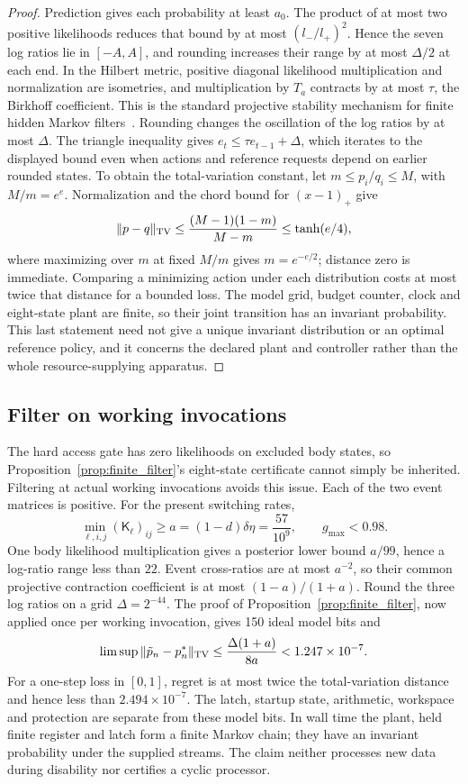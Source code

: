 \documentclass[12pt]{article}
\theoremstyle{definition}
\begin{document}
\begin{proof}
Prediction gives each probability at least $a_0$. The product of at most two positive likelihoods reduces that bound by at most $(l_-/l_+)^2$. Hence the seven log ratios lie in $[-A,A]$, and rounding increases their range by at most $\Delta/2$ at each end. In the Hilbert metric, positive diagonal likelihood multiplication and normalization are isometries, and multiplication by $T_a$ contracts by at most $\tau$, the Birkhoff coefficient. This is the standard projective stability mechanism for finite hidden Markov filters~\cite{LeGlandOudjane2004}. Rounding changes the oscillation of the log ratios by at most $\Delta$. The triangle inequality gives $e_t\le\tau e_{t-1}+\Delta$, which iterates to the displayed bound even when actions and reference requests depend on earlier rounded states. To obtain the total-variation constant, let $m\le p_i/q_i\le M$, with $M/m=e^e$. Normalization and the chord bound for $(x-1)_+$ give
\[
 \|p-q\|_{\rm TV}\le\frac{(M-1)(1-m)}{M-m}\le\tanh(e/4),
\]
where maximizing over $m$ at fixed $M/m$ gives $m=e^{-e/2}$; distance zero is immediate. Comparing a minimizing action under each distribution costs at most twice that distance for a bounded loss. The model grid, budget counter, clock and eight-state plant are finite, so their joint transition has an invariant probability. This last statement need not give a unique invariant distribution or an optimal reference policy, and it concerns the declared plant and controller rather than the whole resource-supplying apparatus.
\end{proof}

\subsection{Filter on working invocations}

The hard access gate has zero likelihoods on excluded body states, so Proposition~\ref{prop:finite_filter}'s eight-state certificate cannot simply be inherited. Filtering at actual working invocations avoids this issue. Each of the two event matrices is positive. For the present switching rates,
\[
 \min_{\ell,i,j}(\mathsf K_\ell)_{ij}\ge
 a=(1-d)\delta\eta=\frac{57}{10^9},\qquad g_{\max}<0.98.
\]
One body likelihood multiplication gives a posterior lower bound $a/99$, hence a log-ratio range less than $22$. Event cross-ratios are at most $a^{-2}$, so their common projective contraction coefficient is at most $(1-a)/(1+a)$. Round the three log ratios on a grid $\Delta=2^{-44}$. The proof of Proposition~\ref{prop:finite_filter}, now applied once per working invocation, gives 150 ideal model bits and
\[
 \limsup\|\tilde p_n-p_n^*\|_{\rm TV}
 \le\frac{\Delta(1+a)}{8a}<1.247\times10^{-7}.
\]
For a one-step loss in $[0,1]$, regret is at most twice the total-variation distance and hence less than $2.494\times10^{-7}$. The latch, startup state, arithmetic, workspace and protection are separate from these model bits. In wall time the plant, held finite register and latch form a finite Markov chain; they have an invariant probability under the supplied streams. The claim neither processes new data during disability nor certifies a cyclic processor.
\end{document}
